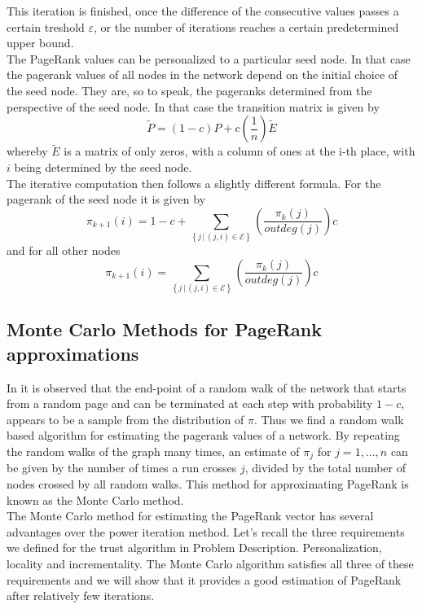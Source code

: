 \documentclass[twocolumn]{article}
\theoremstyle{definition}
\theoremstyle{theorem}
\begin{document}
\noindent This iteration is finished, once the difference of the consecutive values passes a certain treshold $\varepsilon$, or the number of iterations reaches a certain predetermined upper bound.\vspace{1em}\\

\noindent The PageRank values can be personalized to a particular seed node. In that case the pagerank values of all nodes in the network depend on the initial choice of the seed node. They are, so to speak, the pageranks determined from the perspective of the seed node. In that case the transition matrix is given by 
\[
\tilde{P} = (1-c)P + c\left(\frac{1}{n}\right)\tilde{E} 
\]
whereby $\tilde{E}$ is a matrix of only zeros, with a column of ones at the i-th place, with $i$ being determined by the seed node. \vspace{1em}\\

\noindent The iterative computation then follows a slightly different formula. For the pagerank of the seed node it is given by 
\[
\pi_{k+1}(i) = 1-c + \sum_{\left\lbrace j\,|\,(j,i)\in\mathcal{E}\right\rbrace}\left(\frac{\pi_k(j)}{outdeg(j)}\right)c 
\]
and for all other nodes 
\[
\pi_{k+1}(i) = \sum_{\left\lbrace j\,|\,(j,i)\in\mathcal{E}\right\rbrace}\left(\frac{\pi_k(j)}{outdeg(j)}\right)c 
\]
\subsection{Monte Carlo Methods for PageRank approximations}
\label{subsec:MonteCarloMethodsForPageRankApproximations}
In \cite{Monte Carlo methods in PageRank computation: When one iteration is sufficient} it is observed that the end-point of a random walk of the network that starts from a random page and can be terminated at each step with probability $1-c$, appears to be a sample from the distribution of $\pi$. Thus we find a random walk based algorithm for estimating the pagerank values of a network. By repeating the random walks of the graph many times, an estimate of $\pi_j$ for $j = 1,...,n$ can be given by the number of times a run crosses $j$, divided by the total number of nodes crossed by all random walks. This method for approximating PageRank is known as the Monte Carlo method. \vspace{1em}\\

\noindent The Monte Carlo method for estimating the PageRank vector has several advantages over the power iteration method. Let's recall the three requirements we defined for the trust algorithm in Problem Description. Personalization, locality and incrementality. The Monte Carlo algorithm satisfies all three of these requirements and we will show that it provides a good estimation of PageRank after relatively few iterations.\vspace{1em}\\
\end{document}
